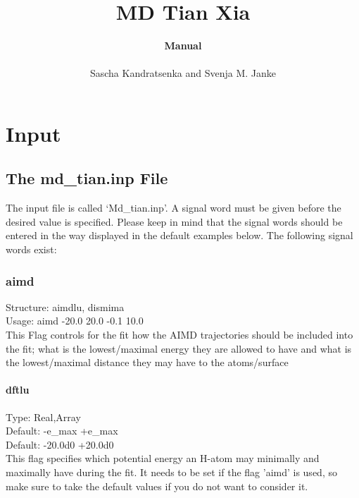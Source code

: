 \documentclass[twoside, 11pt, titlepage, captions=nooneline, a4paper, headsepline]{scrbook}%
\title{\huge{MD Tian Xia}}
\author{\textbf{Manual}\\ \\Sascha Kandratsenka and Svenja M. Janke}
\date{}
\begin{document}
\frontmatter

\maketitle
\thispagestyle{empty}
\newpage
\tableofcontents
\newpage

\mainmatter

\chapter{Input}
\section{The md\_tian.inp File}
The input file is called `Md\_tian.inp'. A signal word must be given before the desired value is specified. Please keep in mind that the signal words should be entered in the way displayed in the default examples below. The following signal words exist:\\

\subsection*{aimd}
Structure: aimdlu, dismima\\
Usage: aimd -20.0 20.0 -0.1 10.0\\
This Flag controls for the fit how the AIMD trajectories should be included into the fit; what is the lowest/maximal energy they are allowed to have and what is the lowest/maximal distance they may have to the atoms/surface
\subsubsection*{dftlu}
Type: Real,Array\\
Default: -e\_max +e\_max\\
Default: -20.0d0 +20.0d0\\
This flag specifies which potential energy an H-atom may minimally and maximally have during the fit. It needs to be set if the flag 'aimd' is used, so make sure to take the default values if you do not want to consider it.
\end{document}
